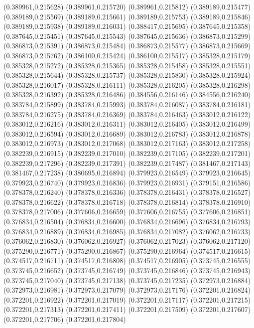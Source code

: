 (0.389961,0.215628)
(0.389961,0.215720)
(0.389961,0.215812)
(0.389189,0.215477)
(0.389189,0.215569)
(0.389189,0.215661)
(0.389189,0.215753)
(0.389189,0.215846)
(0.389189,0.215938)
(0.389189,0.216031)
(0.388417,0.215695)
(0.387645,0.215358)
(0.387645,0.215451)
(0.387645,0.215543)
(0.387645,0.215636)
(0.386873,0.215299)
(0.386873,0.215391)
(0.386873,0.215484)
(0.386873,0.215577)
(0.386873,0.215669)
(0.386873,0.215762)
(0.386100,0.215424)
(0.386100,0.215517)
(0.385328,0.215179)
(0.385328,0.215272)
(0.385328,0.215365)
(0.385328,0.215458)
(0.385328,0.215551)
(0.385328,0.215644)
(0.385328,0.215737)
(0.385328,0.215830)
(0.385328,0.215924)
(0.385328,0.216017)
(0.385328,0.216111)
(0.385328,0.216205)
(0.385328,0.216298)
(0.385328,0.216392)
(0.385328,0.216486)
(0.384556,0.216146)
(0.384556,0.216240)
(0.383784,0.215899)
(0.383784,0.215993)
(0.383784,0.216087)
(0.383784,0.216181)
(0.383784,0.216275)
(0.383784,0.216369)
(0.383784,0.216463)
(0.383012,0.216122)
(0.383012,0.216216)
(0.383012,0.216311)
(0.383012,0.216405)
(0.383012,0.216499)
(0.383012,0.216594)
(0.383012,0.216689)
(0.383012,0.216783)
(0.383012,0.216878)
(0.383012,0.216973)
(0.383012,0.217068)
(0.383012,0.217163)
(0.383012,0.217258)
(0.382239,0.216915)
(0.382239,0.217010)
(0.382239,0.217105)
(0.382239,0.217201)
(0.382239,0.217296)
(0.382239,0.217391)
(0.382239,0.217487)
(0.381467,0.217143)
(0.381467,0.217238)
(0.380695,0.216894)
(0.379923,0.216549)
(0.379923,0.216645)
(0.379923,0.216740)
(0.379923,0.216836)
(0.379923,0.216931)
(0.379151,0.216586)
(0.378378,0.216240)
(0.378378,0.216336)
(0.378378,0.216431)
(0.378378,0.216527)
(0.378378,0.216622)
(0.378378,0.216718)
(0.378378,0.216814)
(0.378378,0.216910)
(0.378378,0.217006)
(0.377606,0.216659)
(0.377606,0.216755)
(0.377606,0.216851)
(0.376834,0.216504)
(0.376834,0.216600)
(0.376834,0.216696)
(0.376834,0.216793)
(0.376834,0.216889)
(0.376834,0.216985)
(0.376834,0.217082)
(0.376062,0.216733)
(0.376062,0.216830)
(0.376062,0.216927)
(0.376062,0.217023)
(0.376062,0.217120)
(0.375290,0.216771)
(0.375290,0.216867)
(0.375290,0.216964)
(0.374517,0.216615)
(0.374517,0.216711)
(0.374517,0.216808)
(0.374517,0.216905)
(0.373745,0.216555)
(0.373745,0.216652)
(0.373745,0.216749)
(0.373745,0.216846)
(0.373745,0.216943)
(0.373745,0.217040)
(0.373745,0.217138)
(0.373745,0.217235)
(0.372973,0.216884)
(0.372973,0.216981)
(0.372973,0.217079)
(0.372973,0.217176)
(0.372201,0.216824)
(0.372201,0.216922)
(0.372201,0.217019)
(0.372201,0.217117)
(0.372201,0.217215)
(0.372201,0.217313)
(0.372201,0.217411)
(0.372201,0.217509)
(0.372201,0.217607)
(0.372201,0.217706)
(0.372201,0.217804)
